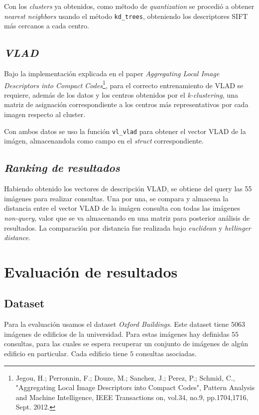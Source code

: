 Con los \emph{clusters} ya obtenidos, como método de \emph{quantization} se procedió a obtener \emph{nearest neighbors} usando el método \texttt{kd\_trees}, obteniendo los descriptores SIFT más cercanos a cada centro.



\subsection{\emph{VLAD}}
Bajo la implementación explicada en el paper \emph{Aggregating Local Image Descriptors into Compact Codes}\footnote{Jegou, H.; Perronnin, F.; Douze, M.; Sanchez, J.; Perez, P.; Schmid, C., "Aggregating Local Image Descriptors into Compact Codes", Pattern Analysis and Machine Intelligence, IEEE Transactions on, vol.34, no.9, pp.1704,1716, Sept. 2012.}, para el correcto entrenamiento de VLAD se requiere, además de los datos y los centros obtenidos por el \emph{k-clustering}, una matriz de asignación correspondiente a los centros más representativos por cada imagen respecto al cluster.

Con ambos datos se uso la función \texttt{vl\_vlad} para obtener el vector VLAD de la imágen, almacenandola como campo en el \emph{struct} correspondiente.



\subsection{\emph{Ranking de resultados}}
Habiendo obtenido los vectores de descripción VLAD, se obtiene del query las 55 imágenes para realizar consultas.
Una por una, se compara y almacena la distancia entre el vector VLAD de la imágen consulta con todas las imágenes \emph{non-query}, valor que se va almacenando en una matriz para posterior análisis de resultados. La comparación por distancia fue realizada bajo \emph{euclidean} y \emph{hellinger distance}.








\section{Evaluación de resultados}

\subsection{Dataset}
Para la evaluación usamos el dataset \emph{Oxford Buildings}. Este dataset tiene $5063$ imágenes de edificios de la universidad. Para estas imágenes hay definidas $55$ consultas, para las cuales se espera recuperar un conjunto de imágenes de algún edificio en particular. Cada edificio tiene $5$ consultas asociadas.

